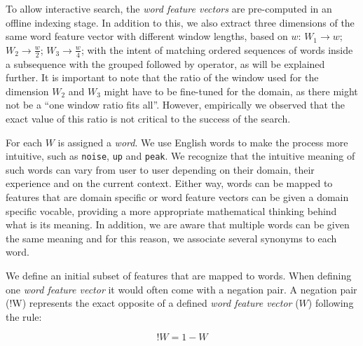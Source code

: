 {To allow interactive search, the \textit{word feature vectors} are pre-computed in an offline indexing stage. In addition to this, we also extract three dimensions of the same word feature vector with different window lengths, based on $w$: $W_1 \rightarrow w$; $W_2 \rightarrow \frac{w}{2}$; $W_3 \rightarrow \frac{w}{4}$; with the intent of matching ordered sequences of words inside a subsequence with the grouped followed by operator, as will be explained further. It is important to note that the ratio of the window used for the dimension $W_2$ and $W_3$ might have to be fine-tuned for the domain, as there might not be a “one window ratio fits all”. However, empirically we observed that the exact value of this ratio is not critical to the success of the search.

For each $W$ is assigned a \textit{word}. We use English words to make the process more intuitive, such as \texttt{noise}, \texttt{up} and \texttt{peak}. We recognize that the intuitive meaning of such words can vary from user to user depending on their domain, their experience and on the current context. Either way, words can be mapped to features that are domain specific or word feature vectors can be given a domain specific vocable, providing a more appropriate mathematical thinking behind what is its meaning. In addition, we are aware that multiple words can be given the same meaning and for this reason, we associate several synonyms to each word.
\par
We define an initial subset of features that are mapped to words. When defining one \textit{word feature vector} it would often come with a negation pair. A negation pair (!W) represents the exact opposite of a defined \textit{word feature vector} ($W$) following the rule:

\begin{equation}
\label{eq:neg_pair}
!W = 1-W
\end{equation}


}
